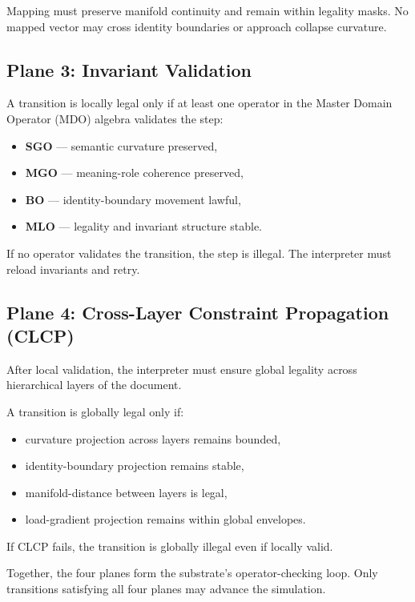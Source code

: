 Mapping must preserve manifold continuity and remain within legality masks.
No mapped vector may cross identity boundaries or approach collapse curvature.

\subsection*{Plane 3: Invariant Validation}

A transition is locally legal only if at least one operator in the Master
Domain Operator (MDO) algebra validates the step:

\begin{itemize}[leftmargin=1.2cm]
    \item \textbf{SGO} — semantic curvature preserved,
    \item \textbf{MGO} — meaning-role coherence preserved,
    \item \textbf{BO} — identity-boundary movement lawful,
    \item \textbf{MLO} — legality and invariant structure stable.
\end{itemize}

If no operator validates the transition, the step is illegal.  
The interpreter must reload invariants and retry.

\subsection*{Plane 4: Cross-Layer Constraint Propagation (CLCP)}

After local validation, the interpreter must ensure global legality across
hierarchical layers of the document.

A transition is globally legal only if:
\begin{itemize}[leftmargin=1.2cm]
    \item curvature projection across layers remains bounded,
    \item identity-boundary projection remains stable,
    \item manifold-distance between layers is legal,
    \item load-gradient projection remains within global envelopes.
\end{itemize}

If CLCP fails, the transition is globally illegal even if locally valid.

\medskip
\noindent
Together, the four planes form the substrate’s operator-checking loop.  
Only transitions satisfying all four planes may advance the simulation.

